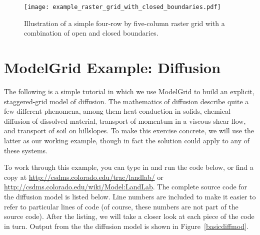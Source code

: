 \documentclass[12pt]{article}
\begin{document}
 \begin{figure}[h!]
    \centering
    \texttt{[image: example\_raster\_grid\_with\_closed\_boundaries.pdf]}
    \caption{Illustration of a simple four-row by five-column raster grid with a combination of open and closed boundaries.}
   \label{raster4x5openclosed}
\end{figure}





\section{ModelGrid Example: Diffusion} 

The following is a simple tutorial in which we use ModelGrid to build an explicit, staggered-grid model of diffusion. The mathematics of diffusion describe quite a few different phenomena, among them heat conduction in solids, chemical diffusion of dissolved material, transport of momentum in a viscous shear flow, and transport of soil on hillslopes. To make this exercise concrete, we will use the latter as our working example, though in fact the solution could apply to any of these systems.

To work through this example, you can type in and run the code below, or find a copy at \url{http://csdms.colorado.edu/trac/landlab/} or \url{http://csdms.colorado.edu/wiki/Model:LandLab}. The complete source code for the diffusion model is listed below. Line numbers are included to make it easier to refer to particular lines of code (of course, these numbers are not part of the source code). After the listing, we will take a closer look at each piece of the code in turn. Output from the the diffusion model is shown in Figure~\ref{basicdiffmod}.
\end{document}
